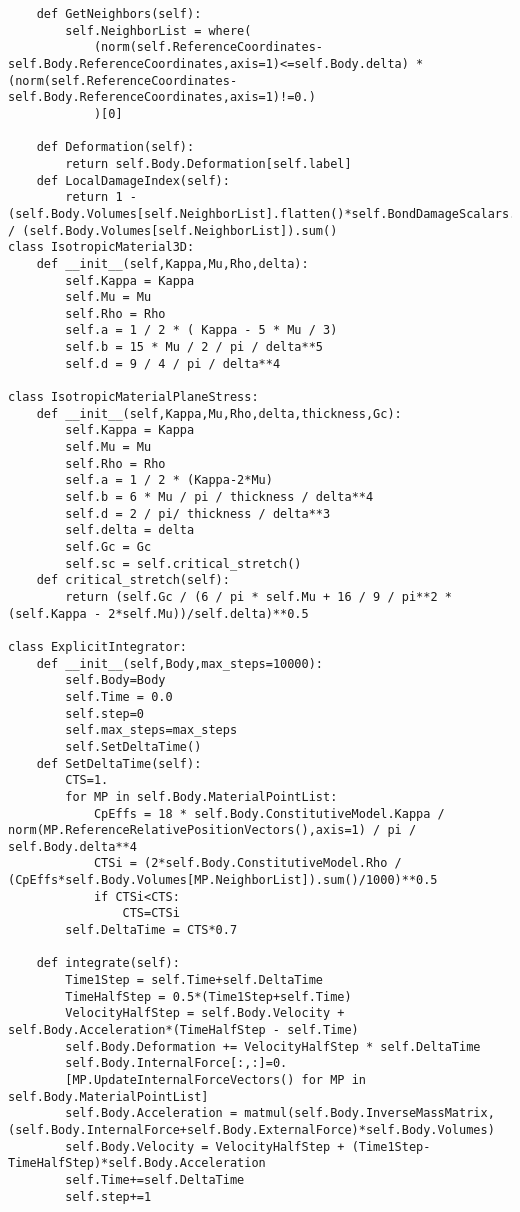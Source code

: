 \documentclass[10pt,a4paper,onecolumn]{article}
\begin{document}
\begin{verbatim}
    def GetNeighbors(self):
        self.NeighborList = where(
            (norm(self.ReferenceCoordinates-self.Body.ReferenceCoordinates,axis=1)<=self.Body.delta) *(norm(self.ReferenceCoordinates-self.Body.ReferenceCoordinates,axis=1)!=0.) 
            )[0]

    def Deformation(self):
        return self.Body.Deformation[self.label]
    def LocalDamageIndex(self):
        return 1 - (self.Body.Volumes[self.NeighborList].flatten()*self.BondDamageScalars.astype(int)).sum() / (self.Body.Volumes[self.NeighborList]).sum()
class IsotropicMaterial3D:
    def __init__(self,Kappa,Mu,Rho,delta):
        self.Kappa = Kappa
        self.Mu = Mu
        self.Rho = Rho
        self.a = 1 / 2 * ( Kappa - 5 * Mu / 3)
        self.b = 15 * Mu / 2 / pi / delta**5
        self.d = 9 / 4 / pi / delta**4

class IsotropicMaterialPlaneStress:
    def __init__(self,Kappa,Mu,Rho,delta,thickness,Gc):
        self.Kappa = Kappa
        self.Mu = Mu
        self.Rho = Rho
        self.a = 1 / 2 * (Kappa-2*Mu)
        self.b = 6 * Mu / pi / thickness / delta**4
        self.d = 2 / pi/ thickness / delta**3
        self.delta = delta
        self.Gc = Gc
        self.sc = self.critical_stretch()
    def critical_stretch(self):
        return (self.Gc / (6 / pi * self.Mu + 16 / 9 / pi**2 * (self.Kappa - 2*self.Mu))/self.delta)**0.5
    
class ExplicitIntegrator:
    def __init__(self,Body,max_steps=10000):
        self.Body=Body
        self.Time = 0.0
        self.step=0
        self.max_steps=max_steps
        self.SetDeltaTime()
    def SetDeltaTime(self):
        CTS=1.
        for MP in self.Body.MaterialPointList:
            CpEffs = 18 * self.Body.ConstitutiveModel.Kappa / norm(MP.ReferenceRelativePositionVectors(),axis=1) / pi / self.Body.delta**4
            CTSi = (2*self.Body.ConstitutiveModel.Rho / (CpEffs*self.Body.Volumes[MP.NeighborList]).sum()/1000)**0.5
            if CTSi<CTS:
                CTS=CTSi
        self.DeltaTime = CTS*0.7
    
    def integrate(self):
        Time1Step = self.Time+self.DeltaTime
        TimeHalfStep = 0.5*(Time1Step+self.Time)
        VelocityHalfStep = self.Body.Velocity + self.Body.Acceleration*(TimeHalfStep - self.Time)
        self.Body.Deformation += VelocityHalfStep * self.DeltaTime
        self.Body.InternalForce[:,:]=0.
        [MP.UpdateInternalForceVectors() for MP in self.Body.MaterialPointList]
        self.Body.Acceleration = matmul(self.Body.InverseMassMatrix,(self.Body.InternalForce+self.Body.ExternalForce)*self.Body.Volumes)
        self.Body.Velocity = VelocityHalfStep + (Time1Step-TimeHalfStep)*self.Body.Acceleration
        self.Time+=self.DeltaTime
        self.step+=1
        

\end{verbatim}
\end{document}

